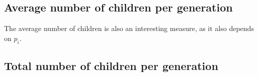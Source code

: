 \documentclass[conference]{IEEEtran}
\begin{document}


    \subsection{Average number of children per generation}
        The average number of children is also an interesting measure, as it also depends on $p_i$.



    \subsection{Total number of children per generation}

\end{document}
